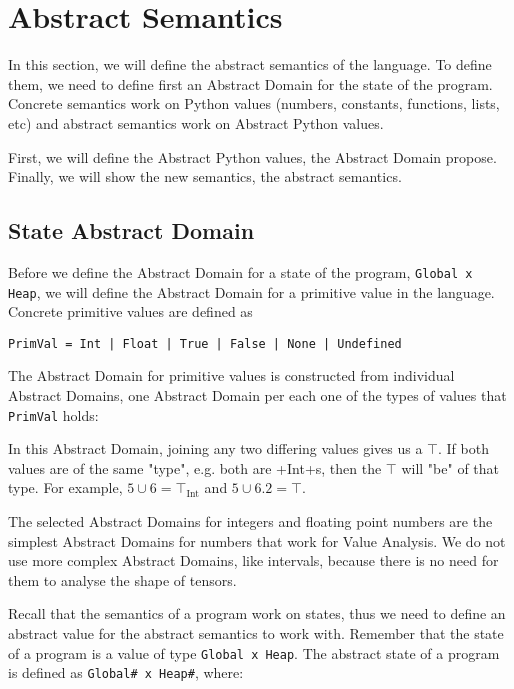 %

\section{Abstract Semantics}

In this section, we will define the abstract semantics of the language. To define them, we
need to define first an Abstract Domain for the state of the program. Concrete semantics
work on Python values (numbers, constants, functions, lists, etc) and abstract semantics
work on Abstract Python values.

First, we will define the Abstract Python values, the Abstract Domain propose. Finally, we
will show the new semantics, the abstract semantics.

\subsection{State Abstract Domain}

Before we define the Abstract Domain for a state of the program, \verb+Global x Heap+, we
will define the Abstract Domain for a primitive value in the language. Concrete
primitive values are defined as

\begin{verbatim}
PrimVal = Int | Float | True | False | None | Undefined
\end{verbatim}

The Abstract Domain for primitive values is constructed from individual Abstract Domains,
one Abstract Domain per each one of the types of values that \verb+PrimVal+ holds:



In this Abstract Domain, joining any two differing values gives us a $\top$. If both
values are of the same "type", e.g. both are \pycode+Int+s, then the $\top$ will "be" of
that type. For example, $5 \cup 6 = \top_{\text{Int}}$ and $5 \cup 6.2 = \top$.

The selected Abstract Domains for integers and floating point numbers are the simplest
Abstract Domains for numbers that work for Value Analysis. We do not use more complex
Abstract Domains, like intervals, because there is no need for them to analyse the shape
of tensors.

Recall that the semantics of a program work on states, thus we need to define an abstract
value for the abstract semantics to work with. Remember that the state of a program is a
value of type \verb+Global x Heap+. The abstract state of a program is defined as
\verb+Global# x Heap#+, where:

